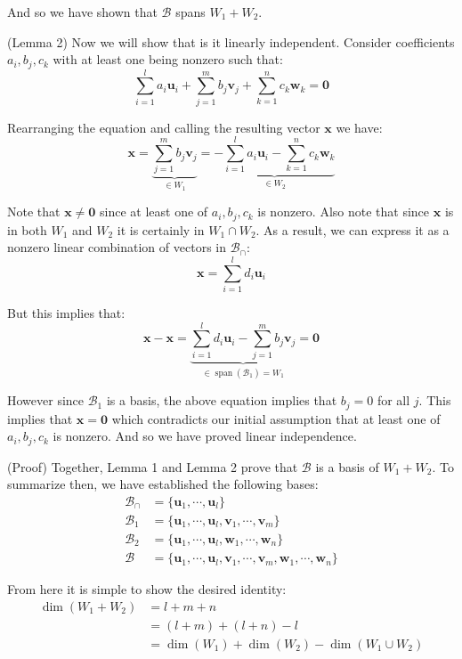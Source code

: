 \documentclass{article}
\renewcommand\vec{\mathbf}
\begin{document}
And so we have shown that $\mathcal B$ spans $W_1+W_2$.

(Lemma 2) Now we will show that is it linearly independent. Consider coefficients $a_i,b_j,c_k$ with at least one being nonzero such that:
$$\sum^l_{i=1}a_i\vec u_i+\sum^m_{j=1}b_j\vec v_j+\sum^n_{k=1}c_k\vec w_k=\vec 0$$

Rearranging the equation and calling the resulting vector $\vec x$ we have:
$$\vec x=\underbrace{\sum^m_{j=1}b_j\vec v_j}_{\in W_1}=\underbrace{-\sum^l_{i=1}a_i\vec u_i-\sum^n_{k=1}c_k\vec w_k}_{\in W_2}$$

Note that $\vec x\not=\vec 0$ since at least one of $a_i,b_j,c_k$ is nonzero. Also note that since $\vec x$ is in both $W_1$ and $W_2$ it is certainly in $W_1\cap W_2$. As a result, we can express it as a nonzero linear combination of vectors in $\mathcal B_\cap$:
$$\vec x=\sum^l_{i=1}d_i\vec u_i$$

But this implies that:
$$\vec x-\vec x=\underbrace{\sum^l_{i=1}d_i\vec u_i-\sum^m_{j=1}b_j\vec v_j}_{\in\operatorname{span}(\mathcal B_1)=W_1}=\vec 0$$

However since $\mathcal B_1$ is a basis, the above equation implies that $b_j=0$ for all $j$. This implies that $\vec x=\vec 0$ which contradicts our initial assumption that at least one of $a_i,b_j,c_k$ is nonzero. And so we have proved linear independence.

(Proof) Together, Lemma 1 and Lemma 2 prove that $\mathcal B$ is a basis of $W_1+W_2$. To summarize then, we have established the following bases:
\begin{align*}
  \mathcal B_\cap&=\{\vec u_1,\cdots,\vec u_l\}\tag{basis of $W_1\cap W_2$}\\
  \mathcal B_1&=\{\vec u_1,\cdots,\vec u_l,\vec v_1,\cdots,\vec v_m\}\tag{basis of $W_1$}\\
  \mathcal B_2&=\{\vec u_1,\cdots,\vec u_l,\vec w_1,\cdots,\vec w_n\}\tag{basis of $W_2$}\\
  \mathcal B&=\{\vec u_1,\cdots,\vec u_l,\vec v_1,\cdots,\vec v_m,\vec w_1,\cdots,\vec w_n\}\tag{basis of $W_1+W_2$}
\end{align*}

From here it is simple to show the desired identity:
\begin{align*}
  \operatorname{dim}(W_1+W_2)&=l+m+n\\
  &=(l+m)+(l+n)-l\\
  &=\operatorname{dim}(W_1)+\operatorname{dim}(W_2)-\operatorname{dim}(W_1\cup W_2)
\end{align*}
\end{document}

